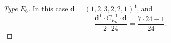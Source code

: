 \documentclass{article}
\theoremstyle{definition}
\renewcommand{\top}{\,\mathsf{t}}
\begin{document}
\begin{proof}[Type $E_6$]
In this case $\mathbf{d}=(1,2, 3,2,2,1)^{\top}$, and
\[ \frac{\mathbf{d}^{\top}\cdot C_{E_6}^{-1}\cdot \mathbf{d}}{2\cdot 24}=\frac{7\cdot 24-1}{24}. \]
\begin{comment}	
	\[
	\frac{1}{2\cdot 24}
	\begin{pmatrix}
	1 \\ 2 \\ 3 \\ 2 \\ 2 \\ 1
	\end{pmatrix}^{\top}
	\cdot
	\begin{pmatrix}
	2 & -1 & 0 & 0 & 0 & 0 \\
	-1 & 2 & -1 & 0 & 0 & 0\\
	0 & -1 & 2 & -1 & -1 & 0 \\
	0 & 0 & -1 & 2 & 0 & 0 \\
	0 & 0 & -1 & 0 & 2 & -1 \\
	0 & 0 & 0 & 0 & -1 & 2
	\end{pmatrix}^{-1}
	\cdot
	\begin{pmatrix}
	1 \\ 2 \\ 3 \\ 2 \\ 2 \\ 1
	\end{pmatrix}
	=\frac{7\cdot 24-1}{24}.
	\]
\end{comment}
\end{proof}
\end{document}
